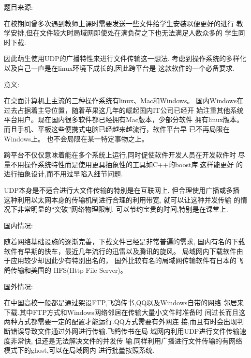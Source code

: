 \documentclass{data/hbue}
\begin{document}


%
\reportabstract
{
\begin{description}
	\item{题目来源:} 

		在校期间曾多次遇到教师上课时需要发送一些文件给学生安装以便更好的进行
		教学安排,但在文件较大时局域网即使处在满负荷之下也无法满足人数众多的
		学生同时下载.

		因此萌生使用UDP的广播特性来进行文件传输这一想法.
		考虑到操作系统的多样化以及自己一直是在linux环境下成长的,因此跨平台是
		这款软件的一个必备要求.

	\item{意义:}

		在桌面计算机上主流的三种操作系统有linux、Mac和Windows。
		国内Windows在过去占据着主导位置，随着苹果这几年的崛起国内IT公司已经开
		始注重其他系统平台用户。现在国内很多软件都已经拥有Mac版本，少部分软件
		拥有linux版本。而且手机、平板这些便携式电脑已经越来越流行，软件平台早
		已不再局限在Windows上。 也不会局限在某一特定事物之上。

		跨平台不仅仅意味着能在多个系统上运行,同时促使软件开发人员在开发软件时
		尽量不用操作系统特性而是使用更具抽象性的工具如C++的boost库.这样能更好
		的进行抽象设计,而不用过早陷入细节问题.

		UDP本身是不适合进行大文件传输的特别是在互联网上, 但合理使用广播或多播
		这种利用以太网本身的传输机制进行合理的利用带宽, 就可以让这种并发传输
		的情况下非常明显的``突破''网络物理限制. 
		可以节约宝贵的时间,特别是在课堂上.
		
\end{description}
}

\reportdescription
{
\begin{description}
	\item{国内情况:}

		随着网络基础设施的逐渐完善，下载文件已经是非常普遍的需求,
		国内有名的下载软件有早期的快车，最近几年流行的迅雷以及腾讯的旋风。
		局域网内下载软件由于应用较少却因此少有特别出名的，
		国外比较有名的局域网传输软件有日本的飞鸽传输和美国的
		HFS(Http File Server)。

	\item{国外情况:}

		在中国高校一般都是通过架设FTP,飞鸽传书,QQ以及Windows自带的网络
		邻居来下载.其中FTP方式和Windows网络邻居在传输大量小文件时准备时
		间过长而且这两种方式都需要一定的配置才能运行.QQ方式需要有外网连
		接,而且有时会出现判断错误导致文件通过外网进行传输.飞鸽传书在局
		域网内利用UDP进行文件传输速度非常快, 但还是无法解决文件的并发传
		输.同样利用广播进行文件传输的有网络模式下的ghost,可以在局域网内
		进行批量按照系统. 

\end{description}
}
\end{document}
